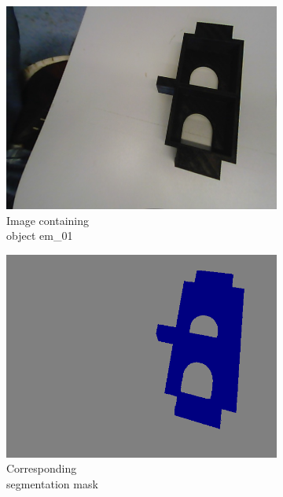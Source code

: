 \begin{itemize}
		\begin{figure}
			\centering
			\begin{subfigure}{.3\textwidth}
  				\centering
  				\includegraphics[width=.9\linewidth]{images/eg_image}
  				\caption{Image containing \\object em\_01}
  				\label{Fig:visualsa}
			\end{subfigure}%
			\begin{subfigure}{.3\textwidth}
  				\centering
  				\includegraphics[width=.9\linewidth]{images/eg_mask}
  				\caption{Corresponding \\segmentation mask}
  				\label{Fig:visualsb}
			\end{subfigure}%
			\begin{subfigure}{.3\textwidth}
  				\centering

\end{subfigure}
\end{figure}
\end{itemize}
